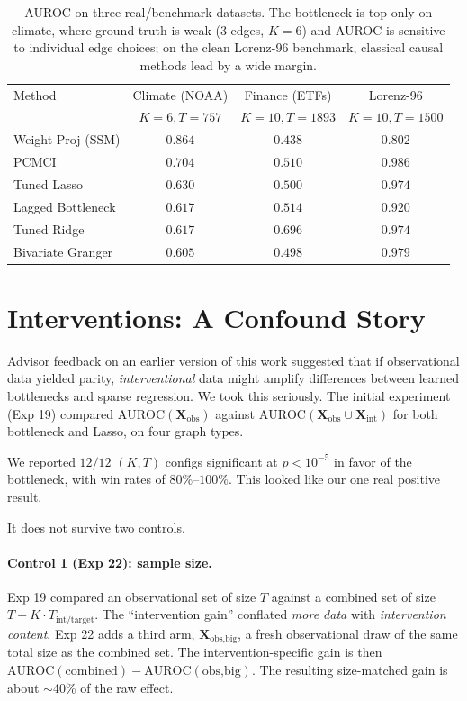 \documentclass{article}
\begin{document}
\begin{table}[t]
\centering
\small
\caption{AUROC on three real/benchmark datasets. The bottleneck is
top only on climate, where ground truth is weak (3 edges, $K{=}6$)
and AUROC is sensitive to individual edge choices; on the clean
Lorenz-96 benchmark, classical causal methods lead by a wide margin.}
\label{tab:real}
\begin{tabular}{lccc}
\toprule
Method & Climate (NOAA) & Finance (ETFs) & Lorenz-96 \\
 & $K{=}6, T{=}757$ & $K{=}10, T{=}1893$ & $K{=}10, T{=}1500$ \\
\midrule
Weight-Proj (SSM) & $\mathbf{0.864}$ & $0.438$ & $0.802$ \\
PCMCI & $0.704$ & $0.510$ & $\mathbf{0.986}$ \\
Tuned Lasso & $0.630$ & $0.500$ & $0.974$ \\
Lagged Bottleneck & $0.617$ & $0.514$ & $0.920$ \\
Tuned Ridge & $0.617$ & $\mathbf{0.696}$ & $0.974$ \\
Bivariate Granger & $0.605$ & $0.498$ & $0.979$ \\
\bottomrule
\end{tabular}
\end{table}

\section{Interventions: A Confound Story}
\label{sec:intervention}

Advisor feedback on an earlier version of this work suggested that if
observational data yielded parity, \emph{interventional} data might
amplify differences between learned bottlenecks and sparse
regression. We took this seriously. The initial experiment (Exp 19)
compared $\text{AUROC}(\mathbf{X}_{\text{obs}})$ against
$\text{AUROC}(\mathbf{X}_{\text{obs}} \cup \mathbf{X}_{\text{int}})$
for both bottleneck and Lasso, on four graph types.

We reported $12 / 12$ $(K, T)$ configs significant at
$p < 10^{-5}$ in favor of the bottleneck, with win rates of
$80\%$–$100\%$. This looked like our one real positive result.

It does not survive two controls.

\paragraph{Control 1 (Exp 22): sample size.}
Exp 19 compared an observational set of size $T$ against a combined
set of size $T + K \cdot T_{\text{int/target}}$. The
``intervention gain'' conflated \emph{more data} with
\emph{intervention content}. Exp 22 adds a third arm,
$\mathbf{X}_{\text{obs,big}}$, a fresh observational draw of the same
total size as the combined set. The intervention-specific gain is
then $\text{AUROC}(\text{combined}) -
\text{AUROC}(\text{obs,big})$. The resulting size-matched gain is
about $\sim$40\% of the raw effect.
\end{document}
